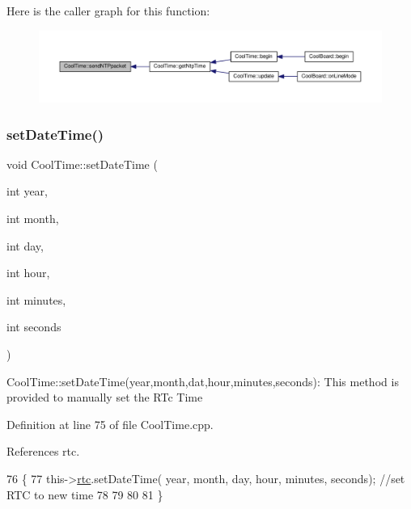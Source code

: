Here is the caller graph for this function\+:
\nopagebreak
\begin{figure}[H]
\begin{center}
\leavevmode
\includegraphics[width=350pt]{classCoolTime_a236a38d120dc53bc67456d763838c5a1_icgraph}
\end{center}
\end{figure}
\mbox{\label{classCoolTime_ab81ea7fdaace111aa01cc1ec84c6d297}} 
\subsubsection{\texorpdfstring{set\+Date\+Time()}{setDateTime()}}
{\footnotesize\ttfamily void Cool\+Time\+::set\+Date\+Time (\begin{DoxyParamCaption}\item[{int}]{year,  }\item[{int}]{month,  }\item[{int}]{day,  }\item[{int}]{hour,  }\item[{int}]{minutes,  }\item[{int}]{seconds }\end{DoxyParamCaption})}

Cool\+Time\+::set\+Date\+Time(year,month,dat,hour,minutes,seconds)\+: This method is provided to manually set the R\+Tc Time 

Definition at line 75 of file Cool\+Time.\+cpp.



References rtc.


\begin{DoxyCode}
76 \{
77             this->\hyperlink{classCoolTime_afa77d58c0c21cfe8b7c27e34d82f07b9}{rtc}.setDateTime( year,  month,  day,  hour,  minutes,  seconds);                      
                   \textcolor{comment}{//set RTC to new time}
78 
79 
80 
81 \}
\end{DoxyCode}
\mbox{\label{classCoolTime_aae601f795452cfa48d9fb337aed483a8}} 
